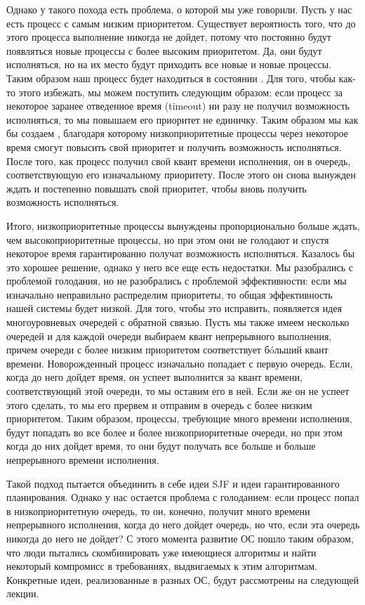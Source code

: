 Однако у такого похода есть проблема, о которой мы уже говорили. Пусть у нас
есть процесс с самым низким приоритетом. Существует вероятность того, что до
этого процесса выполнение никогда не дойдет, потому что постоянно будут
появляться новые процессы с более высоким приоритетом. Да, они будут
исполняться, но на их место будут приходить все новые и новые процессы. Таким
образом наш процесс будет находиться в состоянии . Для того,
чтобы как-то этого избежать, мы можем поступить следующим образом: если процесс
за некоторое заранее отведенное время (timeout) ни разу не получил возможность
исполняться, то мы повышаем его приоритет не единичку. Таким образом мы как бы
создаем , благодаря которому низкоприоритетные процессы через
некоторое время смогут повысить свой приоритет и получить возможность
исполняться. После того, как процесс получил свой квант времени исполнения, он
 в очередь, соответствующую его изначальному приоритету.
После этого он снова вынужден ждать и постепенно повышать свой приоритет, чтобы
вновь получить возможность исполняться.

Итого, низкоприоритетные процессы вынуждены пропорционально больше ждать, чем
высокоприоритетные процессы, но при этом они не голодают и спустя некоторое
время гарантированно получат возможность исполняться. Казалось бы это хорошее
решение, однако у него все еще есть недостатки. Мы разобрались с проблемой
голодания, но не разобрались с проблемой эффективности: если мы изначально
неправильно распределим приоритеты, то общая эффективность нашей системы будет
низкой. Для того, чтобы это исправить, появляется идея многоуровневых очередей с
обратной связью. Пусть мы также имеем несколько очередей и для каждой очереди
выбираем квант непрерывного выполнения, причем очереди с более низким
приоритетом соответствует б\'oльший квант времени. Новорожденный процесс
изначально попадает с первую очередь. Если, когда до него дойдет время, он
успеет выполнится за квант времени, соответствующий этой очереди, то мы оставим
его в ней. Если же он не успеет этого сделать, то мы его прервем и отправим в
очередь с более низким приоритетом. Таким образом, процессы, требующие много
времени исполнения, будут попадать во все более и более низкоприоритетные
очереди, но при этом когда до них дойдет время, то они будут получать все больше
и больше непрерывного времени исполнения.

Такой подход пытается объединить в себе идеи SJF и идеи гарантированного
планирования. Однако у нас остается проблема с голоданием: если процесс попал
в низкоприоритетную очередь, то он, конечно, получит много времени непрерывного
исполнения, когда до него дойдет очередь, но что, если эта очередь никогда до
него не дойдет? С этого момента развитие ОС пошло таким образом, что люди
пытались скомбинировать уже имеющиеся алгоритмы и найти некоторый компромисс в
требованиях, выдвигаемых к этим алгоритмам. Конкретные идеи, реализованные в
разных ОС, будут рассмотрены на следующей лекции.
